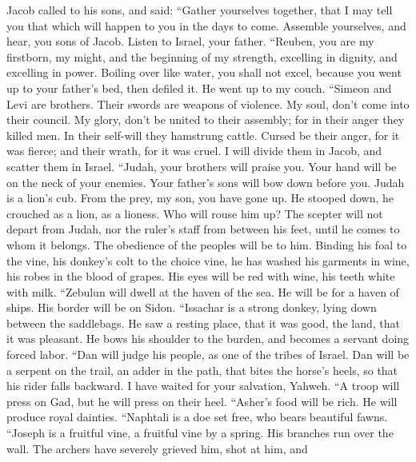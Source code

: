  Jacob called to his sons, and said: ``Gather yourselves
together, that I may tell you that which will happen to you in the days
to come.  Assemble yourselves, and hear, you sons of Jacob.
Listen to Israel, your father.  ``Reuben, you are my
firstborn, my might, and the beginning of my strength, excelling in
dignity, and excelling in power.  Boiling over like water,
you shall not excel, because you went up to your father's bed, then
defiled it. He went up to my couch.  ``Simeon and Levi are
brothers. Their swords are weapons of violence.  My soul,
don't come into their council. My glory, don't be united to their
assembly; for in their anger they killed men. In their self-will they
hamstrung cattle.  Cursed be their anger, for it was fierce;
and their wrath, for it was cruel. I will divide them in Jacob, and
scatter them in Israel.  ``Judah, your brothers will praise
you. Your hand will be on the neck of your enemies. Your father's sons
will bow down before you.  Judah is a lion's cub. From the
prey, my son, you have gone up. He stooped down, he crouched as a lion,
as a lioness. Who will rouse him up?  The scepter will not
depart from Judah, nor the ruler's staff from between his feet, until he
comes to whom it belongs. The obedience of the peoples will be to him.
 Binding his foal to the vine, his donkey's colt to the
choice vine, he has washed his garments in wine, his robes in the blood
of grapes.  His eyes will be red with wine, his teeth white
with milk.  ``Zebulun will dwell at the haven of the sea.
He will be for a haven of ships. His border will be on Sidon.
 ``Issachar is a strong donkey, lying down between the
saddlebags.  He saw a resting place, that it was good, the
land, that it was pleasant. He bows his shoulder to the burden, and
becomes a servant doing forced labor.  ``Dan will judge his
people, as one of the tribes of Israel.  Dan will be a
serpent on the trail, an adder in the path, that bites the horse's
heels, so that his rider falls backward.  I have waited for
your salvation, Yahweh.  ``A troop will press on Gad, but
he will press on their heel.  ``Asher's food will be rich.
He will produce royal dainties.  ``Naphtali is a doe set
free, who bears beautiful fawns.  ``Joseph is a fruitful
vine, a fruitful vine by a spring. His branches run over the wall.
 The archers have severely grieved him, shot at him, and
